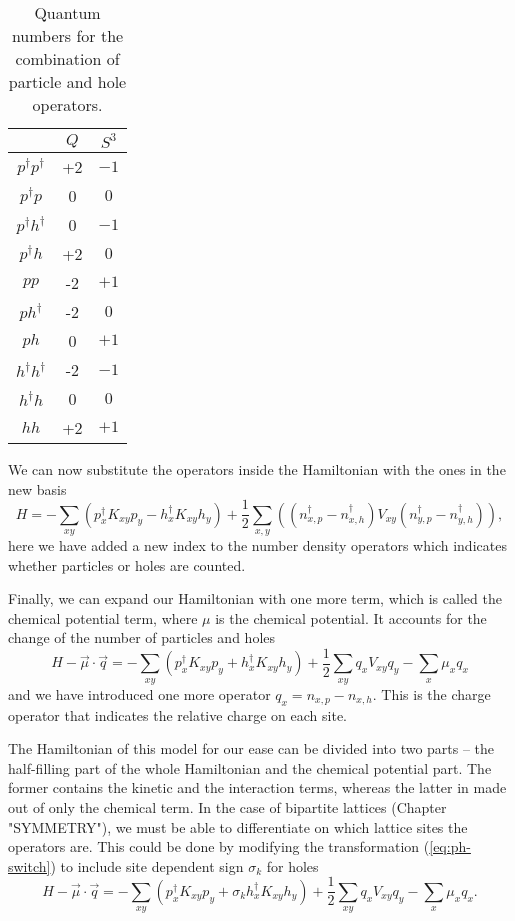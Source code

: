\begin{table}[h]
    \centering
    \begin{tabular}{c|cc}
        & $Q$ & $S^3$ \\
    \hline
        $p^\dagger p^\dagger$ & +2 & $-1$ \\
        $p^\dagger p$ & 0 & $0$ \\
        $p^\dagger h^\dagger$ & 0 & $-1$ \\
        $p^\dagger h$ & +2 & $0$ \\
        $p p$ & -2 & $+1$ \\
        $p h^\dagger$ & -2 & $0$ \\
        $p h$ & 0 & $+1$ \\
        $h^\dagger h^\dagger$ & -2 & $-1$ \\
        $h^\dagger h$ & 0 & $0$ \\
        $h h$ & +2 & $+1$ \\
    \end{tabular}
    \caption{Quantum numbers for the combination of particle and hole operators.}
    \label{tab:ph-comb}
\end{table}

We can now substitute the operators inside the Hamiltonian with the ones in the new basis
\begin{equation}
    H = - \sum_{xy} \left( p^\dagger_x K_{xy} p_y - h^\dagger_x K_{xy} h_y \right) + \frac{1}{2} \sum_{x,y} \left( (n^\dagger_{x,p} - n^\dagger_{x,h}) V_{xy} (n^\dagger_{y,p} - n^\dagger_{y,h}) \right),
\end{equation}
here we have added a new index to the number density operators which indicates whether particles or holes are counted.

Finally, we can expand our Hamiltonian with one more term, which is called the chemical potential term, where $\mu$ is the chemical potential. It accounts for the change of the number of particles and holes
\begin{equation}
    H - \vec{\mu}\cdot\vec{q} = - \sum_{xy} \left( p^\dagger_x K_{xy} p_y + h^\dagger_x K_{xy} h_y \right) + \frac{1}{2}\sum_{xy} q_x V_{xy} q_y - \sum_{x} \mu_x q_x
\end{equation}
and we have introduced one more operator $q_x = n_{x,p} - n_{x,h}$. This is the charge operator that indicates the relative charge on each site. 

The Hamiltonian of this model for our ease can be divided into two parts -- the half-filling part of the whole Hamiltonian and the chemical potential part. The former contains the kinetic and the interaction terms, whereas the latter in made out of only the chemical term. In the case of bipartite lattices (Chapter "SYMMETRY"), we must be able to differentiate on which lattice sites the operators are. This could be done by modifying the transformation (\ref{eq:ph-switch}) to include site dependent sign $\sigma_k$ for holes
\begin{equation}
    H - \vec{\mu}\cdot\vec{q} = - \sum_{xy} \left( p^\dagger_x K_{xy} p_y + \sigma_k h^\dagger_x K_{xy} h_y \right) + \frac{1}{2}\sum_{xy} q_x V_{xy} q_y - \sum_{x} \mu_x q_x.
\end{equation}

